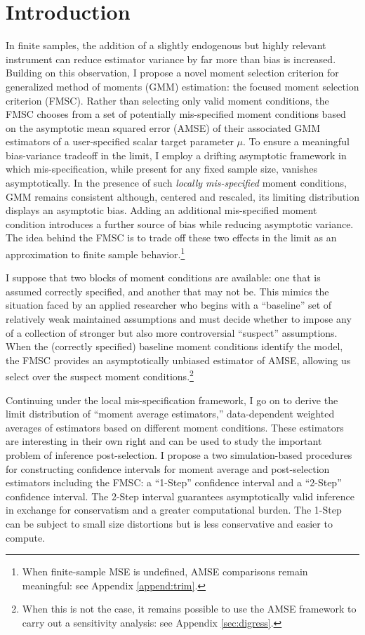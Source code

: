 \section{Introduction}
In finite samples, the addition of a slightly endogenous but highly relevant instrument can reduce estimator variance by far more than bias is increased. 
Building on this observation, I propose a novel moment selection criterion for generalized method of moments (GMM) estimation: the focused moment selection criterion (FMSC). 
Rather than selecting only valid moment conditions, the FMSC chooses from a set of potentially mis-specified moment conditions based on the asymptotic mean squared error (AMSE) of their associated GMM estimators of a user-specified scalar target parameter $\mu$.
To ensure a meaningful bias-variance tradeoff in the limit, I employ a drifting asymptotic framework in which mis-specification, while present for any fixed sample size, vanishes asymptotically.
In the presence of such \emph{locally mis-specified} moment conditions, GMM remains consistent although, centered and rescaled, its limiting distribution displays an asymptotic bias. Adding an additional mis-specified moment condition introduces a further source of bias while reducing asymptotic variance. 
The idea behind the FMSC is to trade off these two effects in the limit as an approximation to finite sample behavior.\footnote{When finite-sample MSE is undefined, AMSE comparisons remain meaningful: see Appendix \ref{append:trim}.}

 
I suppose that two blocks of moment conditions are available: one that is assumed correctly specified, and another that may not be.
This mimics the situation faced by an applied researcher who begins with a ``baseline'' set of relatively weak maintained assumptions and must decide whether to impose any of a collection of stronger but also more controversial ``suspect'' assumptions.
When the (correctly specified) baseline moment conditions identify the model, the FMSC provides an asymptotically unbiased estimator of AMSE, allowing us select over the suspect moment conditions.\footnote{When this is not the case, it remains possible to use the AMSE framework to carry out a sensitivity analysis: see Appendix \ref{sec:digress}.}

Continuing under the local mis-specification framework, I go on to derive the limit distribution of ``moment average estimators,'' data-dependent weighted averages of estimators based on different moment conditions.
These estimators are interesting in their own right and can be used to study the important problem of inference post-selection.
I propose a two simulation-based procedures for constructing confidence intervals for moment average and post-selection estimators including the FMSC: a ``1-Step'' confidence interval and a ``2-Step'' confidence interval.
The 2-Step interval guarantees asymptotically valid inference in exchange for conservatism and a greater computational burden.
The 1-Step can be subject to small size distortions but is less conservative and easier to compute.

